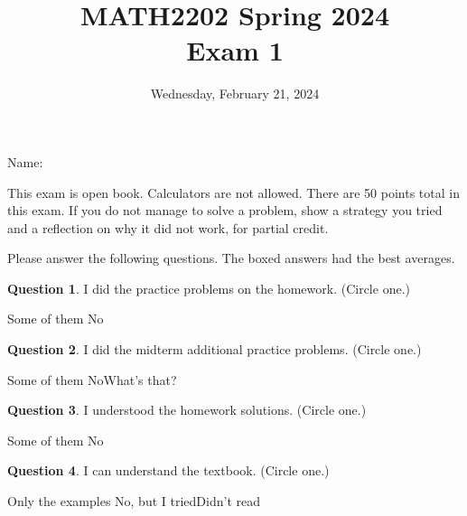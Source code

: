 \documentclass[11pt,oneside]{amsart}
\title{MATH2202 Spring 2024\\
Exam 1}
\author{Wednesday, February 21, 2024}
\theoremstyle{definition}
\newtheorem{question}{Question}
\theoremstyle{plain}
\begin{document}
\maketitle

Name: \underline{\hspace{6cm}}

This exam is open book. Calculators are not allowed. There are 50 points total in this exam. If you do not manage to solve a problem, show a strategy you tried and a reflection on why it did not work, for partial credit.

\vskip 2cm

Please answer the following questions. {\color{blue}The boxed answers had the best averages.}

\begin{question}
  I did the practice problems on the homework. (Circle one.)

  \hspace{1.5cm}\hspace{1.5cm} Some of them\hspace{1.5cm} No
\end{question}

\begin{question}
  I did the midterm additional practice problems. (Circle one.)

  \hspace{1.5cm}\hspace{1.5cm} Some of them\hspace{1.5cm} No\hspace{1.5cm}What's that?
\end{question}

\begin{question}
  I understood the homework solutions. (Circle one.)

  \hspace{1.5cm}\hspace{1.5cm} Some of them\hspace{1.5cm} No
\end{question}

\begin{question}
  I can understand the textbook. (Circle one.)

  \hspace{1.5cm}\hspace{1.5cm} Only the examples\hspace{1.5cm} No, but I tried\hspace{1.5cm}Didn't read
\end{question}
\end{document}
